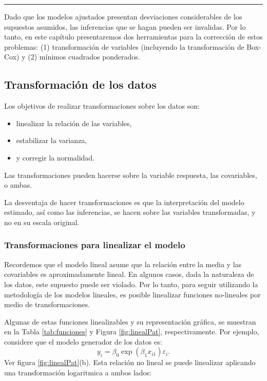 \documentclass[
]{article}
\providecommand{\tightlist}{%
  \setlength{\itemsep}{0pt}\setlength{\parskip}{0pt}}
\begin{document}
\rule{\textwidth}{0.4pt}

Dado que los modelos ajustados presentan desviaciones considerables de los supuestos asumidos, las inferencias que se hagan pueden ser invalidas. Por lo tanto, en este capítulo presentaremos dos herramientas para la corrección de estos problemas: (1) transformación de variables (incluyendo la transformación de Box-Cox) y (2) mínimos cuadrados ponderados.

\hypertarget{transformaciuxf3n-de-los-datos}{%
\subsection{Transformación de los datos}\label{transformaciuxf3n-de-los-datos}}

Los objetivos de realizar transformaciones sobre los datos son:

\begin{itemize}
\tightlist
\item
  linealizar la relación de las variables,
\item
  estabilizar la varianza,
\item
  y corregir la normalidad.
\end{itemize}

Las transformaciones pueden hacerse sobre la variable respuesta, las covariables, o ambas.

La desventaja de hacer transformaciones es que la interpretación del modelo estimado, así como las inferencias, se hacen sobre las variables transformadas, y no en su escala original.

\hypertarget{transformaciones-para-linealizar-el-modelo}{%
\subsubsection{Transformaciones para linealizar el modelo}\label{transformaciones-para-linealizar-el-modelo}}

Recordemos que el modelo lineal asume que la relación entre la media y las covariables es aproximadamente lineal. En algunos casos, dada la naturaleza de los datos, este supuesto puede ser violado. Por lo tanto, para seguir utilizando la metodología de los modelos lineales, es posible linealizar funciones no-lineales por medio de transformaciones.

Algunas de estas funciones linealizables y su representación gráfica, se muestran en la Tabla \ref{tab:funciones} y Figura \ref{fig:linealPat}, respectivamente. Por ejemplo, considere que el modelo generador de los datos es:
\[
y_{i} = \beta_{0}\exp\left(\beta_{1}x_{i1} \right)\varepsilon_{i}.
\]
Ver figura \ref{fig:linealPat}(b). Esta relación no lineal se puede linealizar aplicando una transformación logaritmica a ambos lados:
\end{document}
